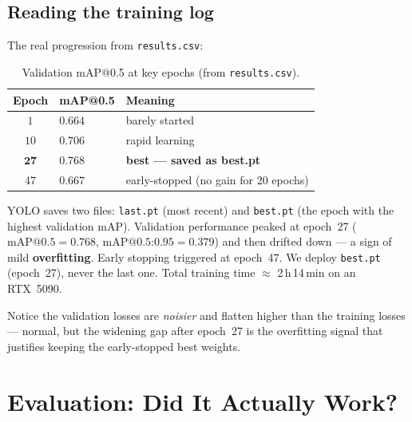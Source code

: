 \section{Reading the training log}
The real progression from \texttt{results.csv}:

\begin{table}[H]\centering
\caption{Validation mAP@0.5 at key epochs (from \texttt{results.csv}).}
\label{tab:milestones}
\begin{tabular}{cll}
\toprule
Epoch & mAP@0.5 & Meaning \\
\midrule
$1$  & $0.664$ & barely started \\
$10$ & $0.706$ & rapid learning \\
$\mathbf{27}$ & $\mathbf{0.768}$ & \textbf{best --- saved as best.pt} \\
$47$ & $0.667$ & early-stopped (no gain for 20 epochs) \\
\bottomrule
\end{tabular}
\end{table}

\begin{keyconcept}
YOLO saves two files: \texttt{last.pt} (most recent) and
\texttt{best.pt} (the epoch with the highest validation mAP). Validation
performance peaked at epoch~27 ($\text{mAP@0.5}=0.768$,
$\text{mAP@0.5:0.95}=0.379$) and then drifted down --- a sign of mild
\textbf{overfitting}. Early stopping triggered at epoch~47. We deploy
\texttt{best.pt} (epoch~27), never the last one. Total training time
$\approx$ 2\,h\,14\,min on an RTX~5090.
\end{keyconcept}


\begin{warningbox}
Notice the validation losses are \emph{noisier} and flatten higher than
the training losses --- normal, but the widening gap after epoch~27 is the
overfitting signal that justifies keeping the early-stopped best weights.
\end{warningbox}

\chapter{Evaluation: Did It Actually Work?}
\label{ch:eval}

